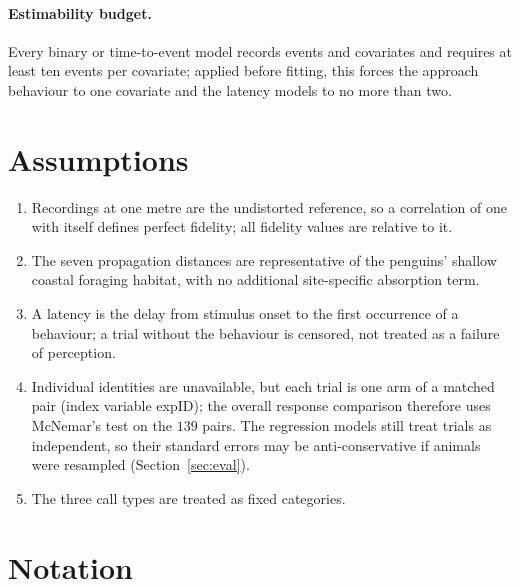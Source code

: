 \documentclass{apmcmthesis}
\begin{document}
\paragraph{Estimability budget.} Every binary or time-to-event model records events and
covariates and requires at least ten events per covariate\cite{peduzzi,austin}; applied before
fitting, this forces the approach behaviour to one covariate and the latency models to no
more than two.



\section{Assumptions}

\begin{enumerate}[label=\textbf{A\arabic*.},leftmargin=*]
\item Recordings at one metre are the undistorted reference, so a correlation of one with
itself defines perfect fidelity; all fidelity values are relative to it.
\item The seven propagation distances are representative of the penguins' shallow coastal
foraging habitat, with no additional site-specific absorption term.
\item A latency is the delay from stimulus onset to the first occurrence of a behaviour; a
trial without the behaviour is censored, not treated as a failure of perception.
\item Individual identities are unavailable, but each trial is one arm of a matched pair
(index variable expID); the overall response comparison therefore uses McNemar's test on
the $139$ pairs. The regression models still treat trials as independent, so their
standard errors may be anti-conservative if animals were resampled
(Section~\ref{sec:eval}).
\item The three call types are treated as fixed categories.
\end{enumerate}

\section{Notation}
\end{document}
